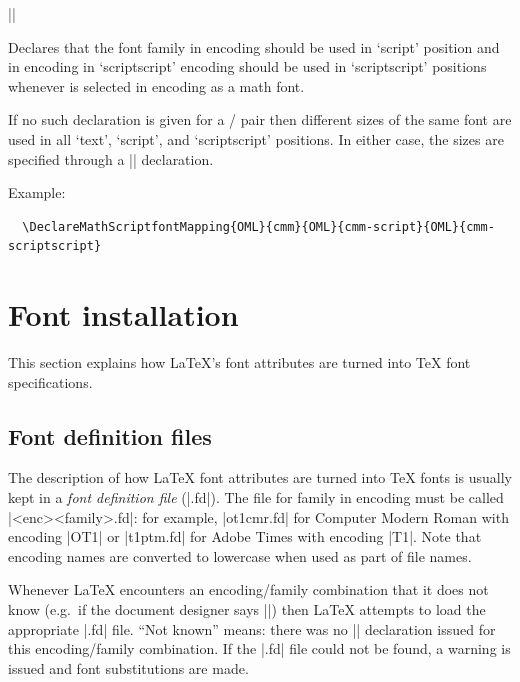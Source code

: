 \documentclass{ltxguide}[1995/11/28]
\begin{document}
\begin{decl}
  |\DeclareMathScriptfontMapping|  
                                   
                                   
\end{decl}

Declares that the font family  in encoding  should
be used in `script' position and  in encoding 
in `scriptscript' encoding should be used in `scriptscript' positions
whenever  is selected in encoding  as a math font.

If no such declaration is given for a / pair then
different sizes of the same font are used in all `text', `script', and
`scriptscript' positions.
In either case, the sizes are specified through a |\DeclareMathSizes|
declaration.

Example:
\begin{verbatim}
  \DeclareMathScriptfontMapping{OML}{cmm}{OML}{cmm-script}{OML}{cmm-scriptscript}
\end{verbatim}

\section{Font installation}
\label{sec:install}

This section explains how \LaTeX's font attributes are turned into
\TeX{} font specifications.


\subsection{Font definition files}

The description of how \LaTeX{} font attributes are turned into \TeX{}
fonts is usually kept in a \emph{font definition file} (|.fd|).  The
file for family  in encoding  must be called
|<enc><family>.fd|: for example, |ot1cmr.fd| for Computer Modern Roman
with encoding |OT1| or |t1ptm.fd| for Adobe Times with encoding |T1|.
Note that encoding names are converted to lowercase when used as part of
file names.

Whenever \LaTeX{} encounters an encoding/family combination that it does
not know (e.g.~if the document designer says
|\selectfont|) then \LaTeX{} attempts to load the
appropriate |.fd| file.  ``Not known'' means: there was no
|\DeclareFontFamily| declaration issued for this encoding/family
combination.  If the |.fd| file could not be found, a warning is issued
and font substitutions are made.
\end{document}
